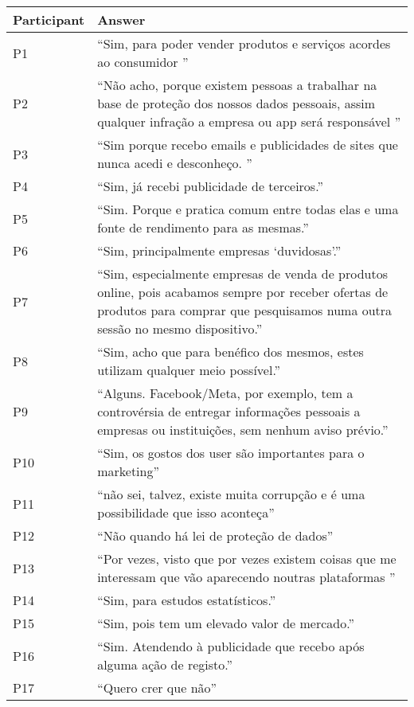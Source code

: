 \begin{longtable}{p{3cm} p{13cm}}
    \hline
    \textbf{Participant} & \textbf{Answer} \\
    \hline
    P1 & ``Sim, para poder vender produtos e serviços acordes ao consumidor '' \\
    \hline
    P2 & ``Não acho, porque existem pessoas a trabalhar na base de proteção dos nossos dados pessoais, assim qualquer infração a empresa ou app será responsável '' \\
    \hline
    P3 & ``Sim porque recebo emails e publicidades de sites que nunca acedi e desconheço. '' \\
    \hline
    P4 & ``Sim, já recebi publicidade de terceiros.'' \\
    \hline
    P5 & ``Sim. Porque e pratica comum entre todas elas e uma fonte de rendimento para as mesmas.'' \\
    \hline
    P6 & ``Sim, principalmente empresas `duvidosas'.'' \\
    \hline
    P7 & ``Sim, especialmente empresas de venda de produtos online, pois acabamos sempre por receber ofertas de produtos para comprar que pesquisamos numa outra sessão no mesmo dispositivo.'' \\
    \hline
    P8 & ``Sim, acho que para benéfico dos mesmos, estes utilizam qualquer meio possível.'' \\
    \hline
    P9 & ``Alguns. Facebook/Meta, por exemplo, tem a controvérsia de entregar informações pessoais a empresas ou instituições, sem nenhum aviso prévio.'' \\
    \hline
    P10 & ``Sim, os gostos  dos user são importantes para o marketing'' \\
    \hline
    P11 & ``não sei, talvez, existe muita corrupção e é uma possibilidade que isso aconteça'' \\
    \hline
    P12 & ``Não quando há lei de proteção de dados'' \\
    \hline
    P13 & ``Por vezes, visto que por vezes existem coisas que me interessam que vão aparecendo noutras plataformas '' \\
    \hline
    P14 & ``Sim, para estudos estatísticos.'' \\
    \hline
    P15 & ``Sim, pois tem um elevado valor de mercado.'' \\
    \hline
    P16 & ``Sim. Atendendo à publicidade que recebo após alguma ação de registo.'' \\
    \hline
    P17 & ``Quero crer que não'' \\

\end{longtable}
